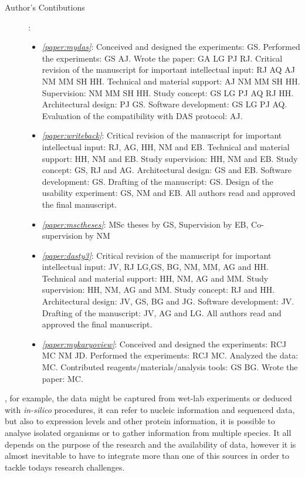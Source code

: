 \begin{description}
	\item[Author's Contibutions]:\\
		\begin{itemize}
			\item \emph{\ref{paper:mydas}}: Conceived and designed the experiments: GS. Performed the experiments: GS AJ. Wrote the paper: GA LG PJ RJ. Critical revision of the manuscript for important intellectual input: RJ AQ AJ NM MM SH HH. Technical and material support: AJ NM MM SH HH. Supervision: NM MM SH HH. Study concept: GS LG PJ AQ RJ HH. Architectural design: PJ GS. Software development: GS LG PJ AQ. Evaluation of the compatibility with DAS protocol: AJ.
			\item \emph{\ref{paper:writeback}}: Critical revision of the manuscript for important intellectual input: RJ, AG, HH, NM and EB. Technical and material support: HH, NM and EB. Study supervision: HH, NM and EB. Study concept: GS, RJ and AG. Architectural design: GS and EB. Software development: GS. Drafting of the manuscript: GS. Design of the usability experiment: GS, NM and EB. All authors read and approved the final manuscript.
			\item \emph{\ref{paper:msctheses}}: MSc theses by GS, Supervision by EB, Co-supervision by NM
			\item \emph{\ref{paper:dasty3}}: Critical revision of the manuscript for important intellectual input: JV, RJ LG,GS, BG, NM, MM, AG and HH. Technical and material support: HH, NM, AG and MM. Study supervision: HH, NM, AG and MM. Study concept:  RJ and HH. Architectural design: JV, GS, BG and JG. Software development: JV. Drafting of the manuscript: JV, AG and LG. All authors read and approved the final manuscript.
			\item \emph{\ref{paper:mykaryoview}}: Conceived and designed the experiments: RCJ MC NM JD. Performed the experiments: RCJ MC. Analyzed the data: MC. Contributed reagents/materials/analysis tools: GS BG. Wrote the paper: MC.
		\end{itemize}
\end{description}
\newpage


, for example, the data might be captured from wet-lab experiments or deduced with \emph{in-silico} procedures, it can refer to nucleic information and sequenced data, but also to expression levels and other protein information, it is possible to analyse isolated organisms or to gather information from multiple species. It all depends on the purpose of the research and the availability of data, however it is almost inevitable to have to integrate more than one of this sources in order to tackle todays research challenges.

